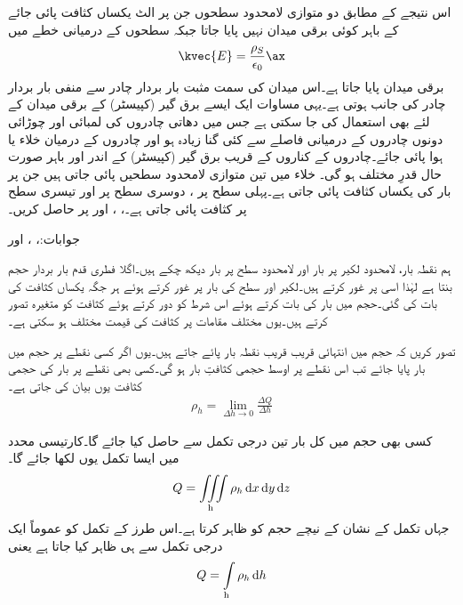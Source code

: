 اس نتیجے کے مطابق دو متوازی لامحدود سطحوں جن پر الٹ یکساں کثافت پائی جائے کے باہر کوئی برقی میدان نہیں پایا جاتا جبکہ سطحوں کے درمیانی خطے میں
\begin{align}\label{مساوات_کولمب_متوازی_چادر_کپیسٹر_کا_میدان}
\kvec{E}=\frac{\rho_S}{\epsilon_0}\ax
\end{align}
برقی میدان پایا جاتا ہے۔اس میدان کی سمت مثبت بار بردار چادر سے منفی بار بردار چادر کی جانب ہوتی ہے۔یہی مساوات ایک ایسے برق گیر (کپیسٹر) کے برقی میدان کے لئے بھی استعمال کی جا سکتی ہے  جس میں دھاتی چادروں  کی لمبائی اور چوڑائی دونوں چادروں کے درمیانی فاصلے سے کئی گنا زیادہ ہو اور چادروں کے درمیان خلاء یا ہوا پائی جائے۔چادروں کے کناروں کے قریب برق گیر (کپیسٹر) کے اندر اور باہر صورت حال قدرِ مختلف ہو گی۔ 
خلاء میں تین متوازی لامحدود سطحیں پائی جاتی ہیں جن پر بار کی یکساں کثافت پائی جاتی ہے۔پہلی سطح  پر  ، دوسری سطح   پر   اور تیسری سطح  پر   کثافت پائی جاتی ہے۔، ، اور  پر  حاصل کریں۔

جوابات:، ،  اور  

ہم نقطہ بار، لامحدود لکیر پر بار اور لامحدود سطح پر بار دیکھ چکے ہیں۔اگلا فطری قدم  بار بردار حجم بنتا ہے لہٰذا اسی پر غور کرتے ہیں۔لکیر اور سطح کی بار  پر غور کرتے ہوئے ہر جگہ یکساں کثافت کی بات کی گئی۔حجم میں بار کی بات کرتے ہوئے اس شرط کو دور کرتے ہوئے کثافت کو متغیرہ تصور کرتے ہیں۔یوں مختلف مقامات پر کثافت کی قیمت مختلف ہو سکتی ہے۔

تصور کریں کہ حجم میں انتہائی قریب قریب نقطہ بار پائے جاتے ہیں۔یوں اگر کسی نقطے پر  حجم میں  بار پایا جائے تب اس نقطے پر اوسط حجمی کثافتِ بار  ہو گی۔کسی بھی نقطے پر بار کی حجمی  کثافت  یوں بیان کی جاتی ہے۔
\begin{align}
\rho_h=\lim_{\Delta h \to 0} \frac{\Delta Q}{\Delta h}
\end{align} 

کسی بھی حجم میں کل بار   تین درجی تکمل سے حاصل کیا جائے گا۔کارتیسی محدد میں ایسا تکمل یوں لکھا جائے گا۔
\begin{align}
Q=\iiint\limits_{\text{h}} \rho_h \dif x \dif y \dif z
\end{align}
جہاں تکمل کے نشان کے نیچے  حجم کو ظاہر کرتا ہے۔اس طرز کے تکمل کو عموماً ایک درجی تکمل سے ہی ظاہر کیا جاتا ہے یعنی
\begin{align}
Q=\int\limits_{\text{h}} \rho_h \dif h
\end{align}


